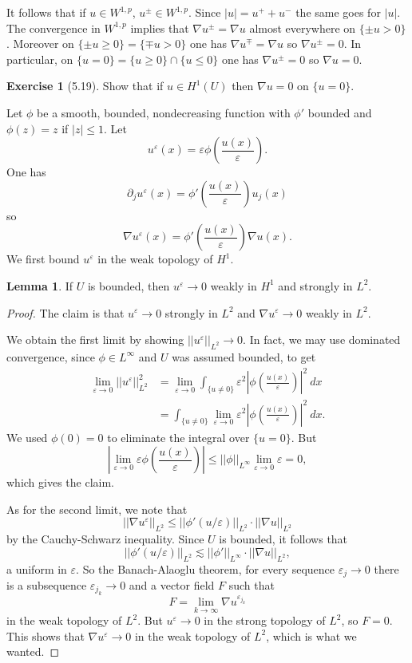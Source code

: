 \documentclass[10pt]{article}
\theoremstyle{definition}
\newtheorem{exer}{Exercise}
\newtheorem{lemma}{Lemma}[exer]
\begin{document}
It follows that if $u \in W^{1,p}$, $u^\pm \in W^{1,p}$. Since $|u| = u^+ + u^-$ the same goes for $|u|$.
The convergence in $W^{1,p}$ implies that $\nabla u^\pm = \nabla u$ almost everywhere on $\{\pm u > 0\}$.
Moreover on $\{\pm u \geq 0\} = \{\mp u > 0\}$ one has $\nabla u^\mp = \nabla u$ so $\nabla u^\pm = 0$.
In particular, on $\{u = 0\} = \{u \geq 0\} \cap \{u \leq 0\}$ one has $\nabla u^\pm = 0$ so $\nabla u = 0$.

\begin{exer}[5.19]
Show that if $u \in H^1(U)$ then $\nabla u = 0$ on $\{u = 0\}$.
\end{exer}

Let $\phi$ be a smooth, bounded, nondecreasing function with $\phi'$ bounded and $\phi(z) = z$ if $|z| \leq 1$.
Let
$$u^\varepsilon(x) = \varepsilon \phi\left(\frac{u(x)}{\varepsilon}\right).$$
One has
$$\partial_j u^\varepsilon(x) = \phi'\left(\frac{u(x)}{\varepsilon}\right) u_j(x)$$
so
$$\nabla u^\varepsilon(x) = \phi'\left(\frac{u(x)}{\varepsilon}\right) \nabla u(x).$$
We first bound $u^\varepsilon$ in the weak topology of $H^1$.
\begin{lemma}
If $U$ is bounded, then $u^\varepsilon \to 0$ weakly in $H^1$ and strongly in $L^2$.
\end{lemma}
\begin{proof}
The claim is that $u^\varepsilon \to 0$ strongly in $L^2$ and $\nabla u^\varepsilon \to 0$ weakly in $L^2$.

We obtain the first limit by showing $||u^\varepsilon||_{L^2} \to 0$. In fact, we may use dominated convergence, since $\phi \in L^\infty$ and $U$ was assumed bounded, to get
\begin{align*}
\lim_{\varepsilon \to 0} ||u^\varepsilon||_{L^2}^2 &= \lim_{\varepsilon \to 0} \int_{\{u \neq 0\}} \varepsilon^2 \left|\phi\left(\frac{u(x)}{\varepsilon}\right)\right|^2 ~dx\\
&= \int_{\{u \neq 0\}} \lim_{\varepsilon \to 0}\varepsilon^2\left|\phi\left(\frac{u(x)}{\varepsilon}\right)\right|^2~dx.
\end{align*}
We used $\phi(0) = 0$ to eliminate the integral over $\{u = 0\}$.
But
$$\left|\lim_{\varepsilon \to 0}\varepsilon\phi\left(\frac{u(x)}{\varepsilon}\right)\right| \leq ||\phi||_{L^\infty} \lim_{\varepsilon \to 0}\varepsilon = 0,$$
which gives the claim.

As for the second limit, we note that
$$||\nabla u^\varepsilon||_{L^2} \leq ||\phi'(u/\varepsilon)||_{L^2} \cdot ||\nabla u||_{L^2}$$
by the Cauchy-Schwarz inequality. Since $U$ is bounded, it follows that
$$||\phi'(u/\varepsilon)||_{L^2} \lesssim ||\phi'||_{L^\infty} \cdot ||\nabla u||_{L^2},$$
a uniform in $\varepsilon$. So the Banach-Alaoglu theorem, for every sequence $\varepsilon_j \to 0$ there is a subsequence $\varepsilon_{j_k} \to 0$ and a vector field $F$ such that
$$F = \lim_{k \to \infty} \nabla u^{\varepsilon_{j_k}}$$
in the weak topology of $L^2$. But $u^\varepsilon \to 0$ in the strong topology of $L^2$, so $F = 0$. This shows that $\nabla u^\varepsilon \to 0$ in the weak topology of $L^2$, which is what we wanted.
\end{proof}
\end{document}
